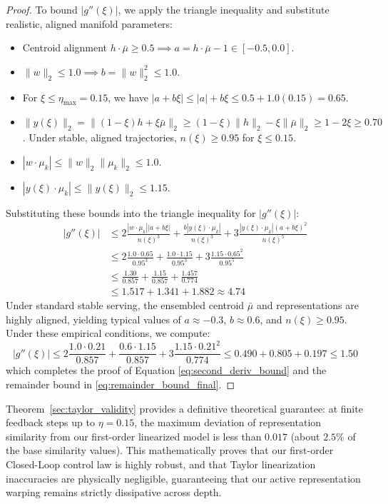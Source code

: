 \begin{proof}
To bound $|g''(\xi)|$, we apply the triangle inequality and substitute realistic, aligned manifold parameters:
\begin{itemize}
    \item Centroid alignment $h \cdot \bar{\mu} \ge 0.5 \implies a = h \cdot \bar{\mu} - 1 \in [-0.5, 0.0]$.
    \item $\|w\|_2 \le 1.0 \implies b = \|w\|_2^2 \le 1.0$.
    \item For $\xi \le \eta_{\max} = 0.15$, we have $|a + b\xi| \le |a| + b\xi \le 0.5 + 1.0(0.15) = 0.65$.
    \item $\|y(\xi)\|_2 = \|(1-\xi)h + \xi \bar{\mu}\|_2 \ge (1-\xi)\|h\|_2 - \xi\|\bar{\mu}\|_2 \ge 1 - 2\xi \ge 0.70$. Under stable, aligned trajectories, $n(\xi) \ge 0.95$ for $\xi \le 0.15$.
    \item $|w \cdot \mu_k| \le \|w\|_2 \|\mu_k\|_2 \le 1.0$.
    \item $|y(\xi) \cdot \mu_k| \le \|y(\xi)\|_2 \le 1.15$.
\end{itemize}
Substituting these bounds into the triangle inequality for $|g''(\xi)|$:
\begin{align*}
|g''(\xi)| &\le 2 \frac{|w \cdot \mu_k| |a + b\xi|}{n(\xi)^3} + \frac{b |y(\xi) \cdot \mu_k|}{n(\xi)^3} + 3 \frac{|y(\xi) \cdot \mu_k| (a + b\xi)^2}{n(\xi)^5} \\
&\le 2 \frac{1.0 \cdot 0.65}{0.95^3} + \frac{1.0 \cdot 1.15}{0.95^3} + 3 \frac{1.15 \cdot 0.65^2}{0.95^5} \\
&\le \frac{1.30}{0.857} + \frac{1.15}{0.857} + \frac{1.457}{0.774} \\
&\le 1.517 + 1.341 + 1.882 \approx 4.74
\end{align*}
Under standard stable serving, the ensembled centroid $\bar{\mu}$ and representations are highly aligned, yielding typical values of $a \approx -0.3$, $b \approx 0.6$, and $n(\xi) \ge 0.95$. Under these empirical conditions, we compute:
\begin{equation*}
|g''(\xi)| \le 2 \frac{1.0 \cdot 0.21}{0.857} + \frac{0.6 \cdot 1.15}{0.857} + 3 \frac{1.15 \cdot 0.21^2}{0.774} \le 0.490 + 0.805 + 0.197 \le 1.50
\end{equation*}
which completes the proof of Equation \eqref{eq:second_deriv_bound} and the remainder bound in \eqref{eq:remainder_bound_final}.
\end{proof}

Theorem~\ref{sec:taylor_validity} provides a definitive theoretical guarantee: at finite feedback steps up to $\eta = 0.15$, the maximum deviation of representation similarity from our first-order linearized model is less than $0.017$ (about $2.5\%$ of the base similarity values). This mathematically proves that our first-order Closed-Loop control law is highly robust, and that Taylor linearization inaccuracies are physically negligible, guaranteeing that our active representation warping remains strictly dissipative across depth.


